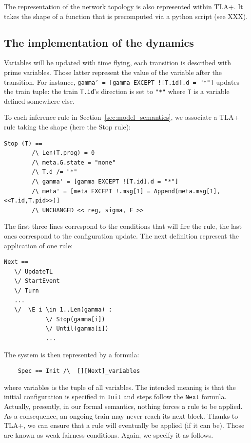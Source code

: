 \documentclass[runningheads]{llncs}
\begin{document}
The representation of the network topology is also represented within TLA+. It takes the shape of a function that is precomputed via a python script (see XXX). 

\subsection{The implementation of the dynamics}

Variables will be updated with time flying, each transition is described with prime variables. Those latter represent the value of the variable after the transition. For instance, \texttt{gamma' = [gamma EXCEPT ![T.id].d = "*"]} updates the train tuple: the train \texttt{T.id}'s direction is set to \texttt{"*"} where  \texttt{T} is a variable  defined somewhere else. 

To each inference rule in Section~\ref{sec:model_semantics}, we associate a TLA+ rule taking the shape (here the Stop rule): 
\begin{verbatim}
Stop (T) ==
        /\ Len(T.prog) = 0
        /\ meta.G.state = "none"
        /\ T.d /= "*"
        /\ gamma' = [gamma EXCEPT ![T.id].d = "*"]
        /\ meta' = [meta EXCEPT !.msg[1] = Append(meta.msg[1],<<T.id,T.pid>>)]
        /\ UNCHANGED << reg, sigma, F >>
 \end{verbatim}
The first three lines correspond to the conditions that will fire the rule, the last ones correspond to the configuration update. The next definition represent the application of one rule:
\begin{verbatim}
Next == 
   \/ UpdateTL
   \/ StartEvent
   \/ Turn
   ...
   \/  \E i \in 1..Len(gamma) :
            \/ Stop(gamma[i])
            \/ Until(gamma[i])
            ...
\end{verbatim}       
        
The system is then represented by a formula:
\begin{verbatim}
    Spec == Init /\  [][Next]_variables
\end{verbatim}%
where variables is the tuple of all variables. The intended meaning is that the initial configuration is specified in \texttt{Init} and steps follow the \texttt{Next} formula.  Actually, presently, in our formal semantics, nothing forces a rule to be applied. As a consequence, an ongoing train may never reach its next block. Thanks to TLA+, we can ensure that a rule will eventually be applied (if it can be). Those are known as weak fairness conditions. Again, we specify it as follows. 
\end{document}
